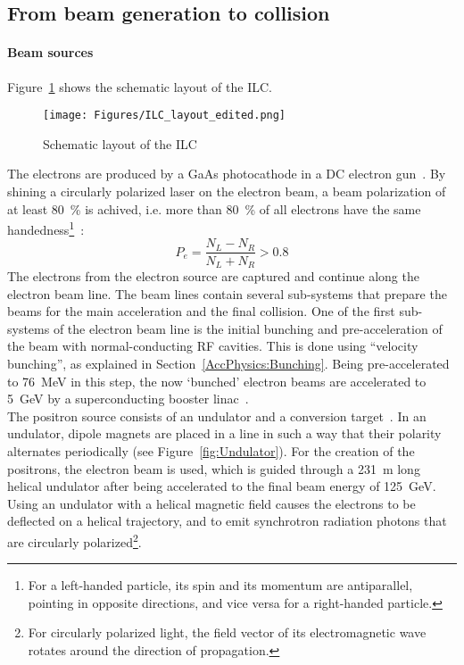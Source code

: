 \subsection{From beam generation to collision}
\label{ILC:layout:details}
\paragraph{Beam sources}
Figure~\ref{fig:ILC_Layout} shows the schematic layout of the ILC.
\begin{figure}
\centering
\texttt{[image: Figures/ILC\_layout\_edited.png]}
\caption[Schematic layout of the ILC]{Schematic layout of the ILC~\cite[based on p. 9]{TDR1}}
\label{fig:ILC_Layout}
\end{figure}
The electrons are produced by a GaAs photocathode in a DC electron gun~\cite[p. 13]{TDR32}.
By shining a circularly polarized laser on the electron beam, a beam polarization of at least \SI{80}{\percent} is achived, i.e. more than \SI{80}{\percent} of all electrons have the same handedness\footnote{For a left-handed particle, its spin and its momentum are antiparallel, pointing in opposite directions, and vice versa for a right-handed particle.}~\cite[p. 81]{TDR32}:
\begin{equation}
 P_e = \frac{N_L-N_R}{N_L+N_R} > 0.8
\end{equation}
The electrons from the electron source are captured and continue along the electron beam line.
The beam lines contain several sub-systems that prepare the beams for the main acceleration and the final collision.
One of the first sub-systems of the electron beam line is the initial bunching and pre-acceleration of the beam with normal-conducting RF cavities.
This is done using ``velocity bunching'', as explained in Section~\ref{AccPhysics:Bunching}.
Being pre-accelerated to \SI{76}{\MeV} in this step, the now `bunched' electron beams are accelerated to \SI{5}{\GeV} by a  superconducting booster linac~\cite[p. 81f]{TDR32}.\\
The positron source consists of an undulator and a conversion target~\cite[p. 90f]{TDR32}.
In an undulator, dipole magnets are placed in a line in such a way that their polarity alternates periodically (see Figure~\ref{fig:Undulator}).
For the creation of the positrons, the electron beam is used, which is guided through a \SI{231}{\meter} long helical undulator after being accelerated to the final beam energy of \SI{125}{\GeV}.
Using an undulator with a helical magnetic field causes the electrons to be deflected on a helical trajectory, and to emit synchrotron radiation photons that are circularly polarized\footnote{For circularly polarized light, the field vector of its electromagnetic wave rotates around the direction of propagation.}.
